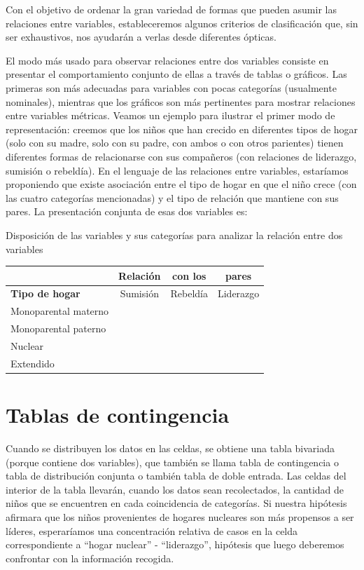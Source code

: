 \documentclass[]{book}
\begin{document}
Con el objetivo de ordenar la gran variedad de formas que pueden asumir las relaciones entre variables, estableceremos algunos criterios de clasificación que, sin ser exhaustivos, nos ayudarán a verlas desde diferentes ópticas.

El modo más usado para observar relaciones entre dos variables consiste en presentar el comportamiento conjunto de ellas a través de tablas o gráficos. Las primeras son más adecuadas para variables con pocas categorías (usualmente nominales), mientras que los gráficos son más pertinentes para mostrar relaciones entre variables métricas. Veamos un ejemplo para ilustrar el primer modo de representación: creemos que los niños que han crecido en diferentes tipos de hogar (solo con su madre, solo con su padre, con ambos o con otros parientes) tienen diferentes formas de relacionarse con sus compañeros (con relaciones de liderazgo,
sumisión o rebeldía). En el lenguaje de las relaciones entre variables,
estaríamos proponiendo que existe asociación entre el tipo de hogar
en que el niño crece (con las cuatro categorías mencionadas) y el tipo
de relación que mantiene con sus pares. La presentación conjunta de esas
dos variables es:

Disposición de las variables y sus categorías para analizar la relación entre dos variables

\begin{longtable}[]{@{}lccc@{}}
\toprule
& Relación & con los & pares\tabularnewline
\midrule
\endhead
\textbf{Tipo de hogar} & Sumisión & Rebeldía & Liderazgo\tabularnewline
Monoparental materno & & &\tabularnewline
Monoparental paterno & & &\tabularnewline
Nuclear & & &\tabularnewline
Extendido & & &\tabularnewline
\bottomrule
\end{longtable}

\hypertarget{tablas-de-contingencia}{%
\section{Tablas de contingencia}\label{tablas-de-contingencia}}

Cuando se distribuyen los datos en las celdas, se obtiene una tabla bivariada (porque contiene dos variables), que también se llama tabla de contingencia o tabla de distribución conjunta o también tabla de doble entrada. Las celdas del interior de la tabla llevarán, cuando los datos sean recolectados, la cantidad de niños que se encuentren en cada coincidencia de categorías. Si nuestra hipótesis afirmara que los niños provenientes de hogares nucleares son más propensos a ser líderes, esperaríamos una concentración relativa de casos en la celda correspondiente a ``hogar nuclear'' - ``liderazgo'', hipótesis que luego deberemos confrontar con la información recogida.
\end{document}
